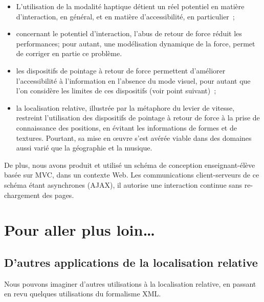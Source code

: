 \documentclass[
]{book}
\providecommand{\tightlist}{%
  \setlength{\itemsep}{0pt}\setlength{\parskip}{0pt}}
\begin{document}
\begin{itemize}
\tightlist
\item
  L'utilisation de la modalité haptique détient un
  réel potentiel en matière d'interaction, en général, et en matière
  d'accessibilité, en particulier~;
\item
  concernant le potentiel d'interaction, l'abus de
  retour de force réduit les performances; pour autant, une modélisation
  dynamique de la force, permet de corriger en partie ce problème.
\item
  les dispositifs de pointage à retour de force
  permettent d'améliorer l'accessibilité à l'information en l'absence du mode
  visuel, pour autant que l'on considère les limites de ces dispositifs (voir
  point suivant)~;
\item
  la localisation relative, illustrée par la métaphore
  du levier de vitesse, restreint l'utilisation des dispositifs de pointage à
  retour de force à la prise de connaissance des positions, en évitant les
  informations de formes et de textures. Pourtant, sa mise en œuvre s'est
  avérée viable dans des domaines aussi varié que la géographie et la
  musique.
\end{itemize}

De plus, nous avons produit et utilisé un schéma de conception
enseignant-élève basée sur MVC, dans un contexte Web. Les communications
client-serveurs de ce schéma étant asynchrones (AJAX), il autorise une
interaction continue sans re-chargement des pages.

\hypertarget{pour-aller-plus-loin}{%
\section{Pour aller plus loin\ldots{}}\label{pour-aller-plus-loin}}

\hypertarget{dautres-applications-de-la-localisation-relative}{%
\subsection{D'autres applications de la localisation relative}\label{dautres-applications-de-la-localisation-relative}}

Nous pouvons imaginer d'autres utilisations à la localisation relative, en
passant en revu quelques utilisations du formalisme XML.
\end{document}
